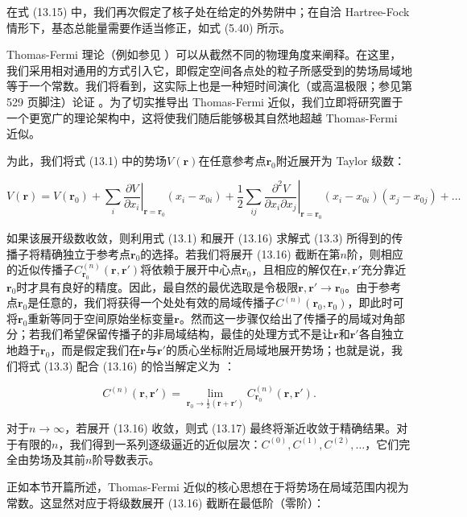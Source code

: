在式 (13.15) 中，我们再次假定了核子处在给定的外势阱中；在自洽 Hartree-Fock 情形下，基态总能量需要作适当修正，如式
(5.40) 所示。

Thomas-Fermi 理论（例如参见 \cite{Th61b}）可以从截然不同的物理角度来阐释。在这里，我们采用相对通用的方式引入它，即假定空间各点处的粒子所感受到的势场局域地等于一个常数。我们将看到，这实际上也是一种短时间演化（或高温极限；参见第
529 页脚注）论证 \cite{Gr72}。为了切实推导出 Thomas-Fermi 近似，我们立即将研究置于一个更宽广的理论架构中，这将使我们随后能够极其自然地超越
Thomas-Fermi 近似。

为此，我们将式 (13.1) 中的势场$V(\boldsymbol{r})$在任意参考点$\boldsymbol{r}_{0}$附近展开为
Taylor 级数：

\[
V(\boldsymbol{r})=V(\boldsymbol{r}_{0})+\sum_{i}\left.\frac{\partial V}{\partial x_{i}}\right|_{\boldsymbol{r}=\boldsymbol{r}_{0}}(x_{i}-x_{0i})+\frac{1}{2}\sum_{ij}\left.\frac{\partial^{2}V}{\partial x_{i}\partial x_{j}}\right|_{\boldsymbol{r}=\boldsymbol{r}_{0}}(x_{i}-x_{0i})(x_{j}-x_{0j})+\dots
\]

如果该展开级数收敛，则利用式 (13.1) 和展开 (13.16) 求解式 (13.3) 所得到的传播子将精确独立于参考点$\boldsymbol{r}_{0}$的选择。若我们将展开
(13.16) 截断在第$n$阶，则相应的近似传播子$C^{(n)}_{\boldsymbol{r}_{0}}(\boldsymbol{r},\boldsymbol{r}')$将依赖于展开中心点$\boldsymbol{r}_{0}$，且相应的解仅在$\boldsymbol{r},\boldsymbol{r}'$充分靠近$\boldsymbol{r}_{0}$时才具有良好的精度。因此，最自然的最优选取是令极限$\boldsymbol{r},\boldsymbol{r}'\to\boldsymbol{r}_{0}$。由于参考点$\boldsymbol{r}_{0}$是任意的，我们将获得一个处处有效的局域传播子$C^{(n)}(\boldsymbol{r}_{0},\boldsymbol{r}_{0})$，即此时可将$\boldsymbol{r}_{0}$重新等同于空间原始坐标变量$\boldsymbol{r}$。然而这一步骤仅给出了传播子的局域对角部分；若我们希望保留传播子的非局域结构，最佳的处理方式不是让$\boldsymbol{r}$和$\boldsymbol{r}'$各自独立地趋于$\boldsymbol{r}_{0}$，而是假定我们在$\boldsymbol{r}$与$\boldsymbol{r}'$的质心坐标附近局域地展开势场；也就是说，我们将式
(13.3) 配合 (13.16) 的恰当解定义为 \cite{DBS78}：

\[
C^{(n)}(\boldsymbol{r},\boldsymbol{r}')=\lim_{\boldsymbol{r}_{0}\to\frac{1}{2}(\boldsymbol{r}+\boldsymbol{r}')}C^{(n)}_{\boldsymbol{r}_{0}}(\boldsymbol{r},\boldsymbol{r}').
\]

对于$n\to\infty$，若展开 (13.16) 收敛，则式 (13.17) 最终将渐近收敛于精确结果。对于有限的$n$，我们得到一系列逐级逼近的近似层次：$C^{(0)},C^{(1)},C^{(2)},\dots$，它们完全由势场及其前$n$阶导数表示。

正如本节开篇所述，Thomas-Fermi 近似的核心思想在于将势场在局域范围内视为常数。这显然对应于将级数展开 (13.16) 截断在最低阶（零阶）：

